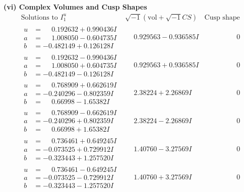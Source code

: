\documentclass[1p]{elsarticle_modified}
\theoremstyle{definition}
\newcommand{\I}{\sqrt{-1}}
\begin{document}
\newpage\flushleft \textbf{(vi) Complex Volumes and Cusp Shapes}
$$\begin{array}{c|c|c}  
\text{Solutions to }I^u_{1}& \I (\text{vol} + \sqrt{-1}CS) & \text{Cusp shape}\\
 \hline 
\begin{aligned}
u &= \phantom{-}0.192632 + 0.990436 I \\
a &= \phantom{-}1.008050 - 0.604735 I \\
b &= -0.482149 + 0.126128 I\end{aligned}
 & \phantom{-}0.929563 - 0.936585 I & \phantom{-0.000000 } 0 \\ \hline\begin{aligned}
u &= \phantom{-}0.192632 - 0.990436 I \\
a &= \phantom{-}1.008050 + 0.604735 I \\
b &= -0.482149 - 0.126128 I\end{aligned}
 & \phantom{-}0.929563 + 0.936585 I & \phantom{-0.000000 } 0 \\ \hline\begin{aligned}
u &= \phantom{-}0.768909 + 0.662619 I \\
a &= -0.240296 - 0.802359 I \\
b &= \phantom{-}0.66998 - 1.65382 I\end{aligned}
 & \phantom{-}2.38224 + 2.26869 I & \phantom{-0.000000 } 0 \\ \hline\begin{aligned}
u &= \phantom{-}0.768909 - 0.662619 I \\
a &= -0.240296 + 0.802359 I \\
b &= \phantom{-}0.66998 + 1.65382 I\end{aligned}
 & \phantom{-}2.38224 - 2.26869 I & \phantom{-0.000000 } 0 \\ \hline\begin{aligned}
u &= \phantom{-}0.736461 + 0.649245 I \\
a &= -0.073525 + 0.729912 I \\
b &= -0.323443 + 1.257520 I\end{aligned}
 & \phantom{-}1.40760 - 3.27569 I & \phantom{-0.000000 } 0 \\ \hline\begin{aligned}
u &= \phantom{-}0.736461 - 0.649245 I \\
a &= -0.073525 - 0.729912 I \\
b &= -0.323443 - 1.257520 I\end{aligned}
 & \phantom{-}1.40760 + 3.27569 I & \phantom{-0.000000 } 0 \\ \hline\begin{aligned}

\end{aligned}
\end{array}$$
\end{document}

